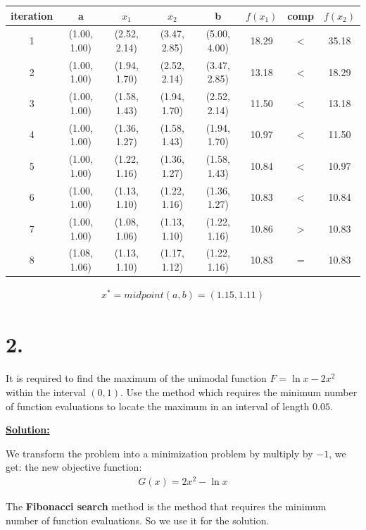 \documentclass{article}
\begin{document}
\begin{tabular}{ |c|c|c|c|c|c|c|c| }
\hline
iteration & a & $x_1$ & $x_2$ & b & $f(x_1)$ & comp & $f(x_2)$ \\ 
\hline 
1 &	(1.00, 1.00) &	(2.52, 2.14)	& (3.47, 2.85)	& (5.00, 4.00)	& 18.29	& $<$ &	35.18 \\
\hline 
2 &	(1.00, 1.00) &	(1.94, 1.70)	& (2.52, 2.14)	& (3.47, 2.85)	& 13.18	& $<$ &	18.29 \\
\hline 
3 &	(1.00, 1.00) &	(1.58, 1.43)	& (1.94, 1.70)	& (2.52, 2.14)	& 11.50	& $<$ &	13.18 \\
\hline 
4 &	(1.00, 1.00) &	(1.36, 1.27)	& (1.58, 1.43)	& (1.94, 1.70)	& 10.97	& $<$ &	11.50 \\
\hline 
5 &	(1.00, 1.00) &	(1.22, 1.16)	& (1.36, 1.27)	& (1.58, 1.43)	& 10.84	& $<$ &	10.97 \\
\hline 
6 &	(1.00, 1.00) &	(1.13, 1.10)	& (1.22, 1.16)	& (1.36, 1.27)	& 10.83	& $<$ &	10.84 \\
\hline 
7 &	(1.00, 1.00) &	(1.08, 1.06)	& (1.13, 1.10)	& (1.22, 1.16)	& 10.86	& $>$ &	10.83 \\
\hline 
8 &	(1.08, 1.06) &	(1.13, 1.10)	& (1.17, 1.12)	& (1.22, 1.16)	& 10.83	& $=$ &	10.83 \\
\hline 
\end{tabular}
\newline


\begin{align*}
  x^* = midpoint(a,b) = (1.15, 1.11)
\end{align*}

\newpage

\section*{2.}
It is required to find the maximum of the unimodal function $F = \ln{x} - 2x^2$ within the interval $(0, 1)$. Use the method which requires the minimum number of function evaluations to locate the maximum in an interval of length $0.05$.

\begin{center}
  \textbf{\underline{Solution:}}  
\end{center}

We transform the problem into a minimization problem by multiply by $-1$, we get: the new objective function:
\begin{align*}
  G(x) = 2x^2 - \ln{x}
\end{align*}

The \textbf{Fibonacci search} method is the method that requires the minimum number of function evaluations. So we use it for the solution.
\end{document}
